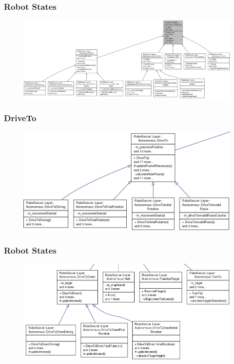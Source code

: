 \documentclass[hyperref={pdfpagelabels=false},compress]{beamer}
\begin{document}
\begin{frame}
	\frametitle{Robot States}
	\center
	\begin{figure}
		\centering
		\includegraphics[width = \textwidth]{inheritance_graph_robotstates.png}
	\end{figure}
\end{frame}

\begin{frame}
	\frametitle{DriveTo}
	\center
	\begin{figure}
		\centering
		\includegraphics[width = \textwidth]{inheritance_graph_robotstates_driveto.png}
	\end{figure}
\end{frame}

\begin{frame}
	\frametitle{Robot States}
	\center
	\begin{figure}
		\centering
		\includegraphics[width = \textwidth]{inheritance_graph_robotstates_rest.png}
	\end{figure}
\end{frame}
\end{document}
